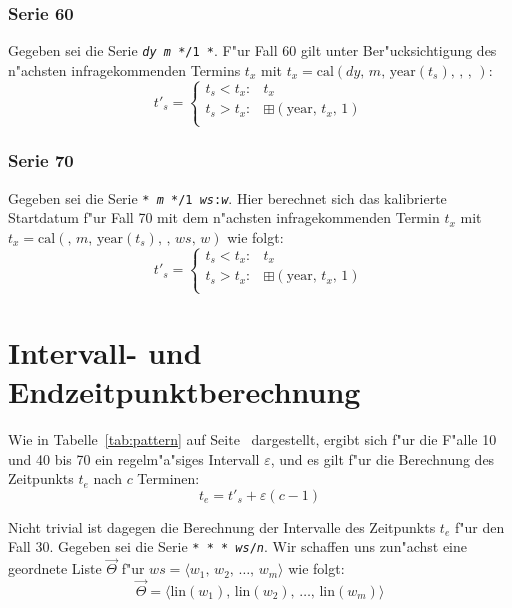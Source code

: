 \documentclass[a4paper]{article}
\newcommand*{\yearf}{\mathrm{year}}
\newcommand*{\linf}{\mathrm{lin}}
\newcommand*{\calf}{\mathrm{cal}}
\newcommand*{\addff}{\boxplus}
\numberwithin{equation}{section}
\begin{document}
\subsubsection{Serie 60}
Gegeben sei die Serie \texttt{\textit{dy} \textit{m} */1 *}. F"ur Fall 60 gilt
unter Ber"ucksichtigung des n"achsten infragekommenden Termins $t_x$ mit
$t_x = \calf(dy,\,m,\,\yearf(t_s),\,,\,,\,)$:
\begin{equation}
  t'_s = \left\{\begin{array}{ll}
    t_s < t_x : & t_x \\
    t_s > t_x : & \addff(\yearf,\,t_x,\,1) \\
  \end{array}\right.
\end{equation}

\subsubsection{Serie 70}
Gegeben sei die Serie \texttt{* \textit{m} */1 \textit{ws}:\textit{w}}. Hier
berechnet sich das kalibrierte Startdatum f"ur Fall 70 mit dem n"achsten
infragekommenden Termin $t_x$ mit $t_x = \calf(,\,m,\,\yearf(t_s),\,,\,ws,\,w)$
wie folgt:
\begin{equation}
  t'_s = \left\{\begin{array}{ll}
    t_s < t_x : & t_x \\
    t_s > t_x : & \addff(\yearf,\,t_x,\,1) \\
  \end{array}\right.
\end{equation}



%
%
%
%
\section{Intervall- und Endzeitpunktberechnung}
\noindent Wie in Tabelle~\ref{tab:pattern} auf Seite~\pageref{tab:pattern}
dargestellt, ergibt sich f"ur die F"alle 10 und 40 bis 70 ein regelm"a"siges
Intervall $\varepsilon$, und es gilt f"ur die Berechnung des Zeitpunkts $t_e$
nach $c$ Terminen:
\begin{equation}\label{eqn:endEasy}
  t_e = t'_s + \varepsilon(c - 1)
\end{equation}

\noindent Nicht trivial ist dagegen die Berechnung der Intervalle des Zeitpunkts
$t_e$ f"ur den Fall 30. Gegeben sei die Serie
\texttt{* * * \textit{ws}/\textit{n}}. Wir schaffen uns zun"achst eine geordnete
Liste $\vec{\Theta}$ f"ur $ws = \langle w_1,\,w_2,\,\dots,\,w_m\rangle$ wie
folgt:
\begin{equation}\label{eqn:theta}
  \vec{\Theta} = \langle \linf(w_1),\,\linf(w_2),\,\dots,\,\linf(w_m)\rangle
\end{equation}
\end{document}
